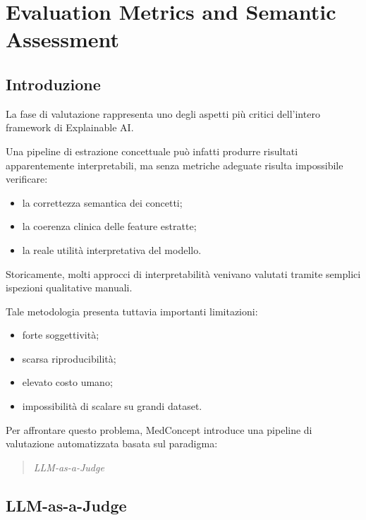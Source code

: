 %
%
\chapter{Evaluation Metrics and Semantic Assessment}

\section{Introduzione}

La fase di valutazione rappresenta uno degli aspetti più critici dell'intero framework di Explainable AI.

Una pipeline di estrazione concettuale può infatti produrre risultati apparentemente interpretabili, ma senza metriche adeguate risulta impossibile verificare:

\begin{itemize}
    \item la correttezza semantica dei concetti;
    \item la coerenza clinica delle feature estratte;
    \item la reale utilità interpretativa del modello.
\end{itemize}

Storicamente, molti approcci di interpretabilità venivano valutati tramite semplici ispezioni qualitative manuali.

Tale metodologia presenta tuttavia importanti limitazioni:

\begin{itemize}
    \item forte soggettività;
    \item scarsa riproducibilità;
    \item elevato costo umano;
    \item impossibilità di scalare su grandi dataset.
\end{itemize}

Per affrontare questo problema, MedConcept introduce una pipeline di valutazione automatizzata basata sul paradigma:

\begin{quote}
\textit{LLM-as-a-Judge}
\end{quote}

\section{LLM-as-a-Judge}

